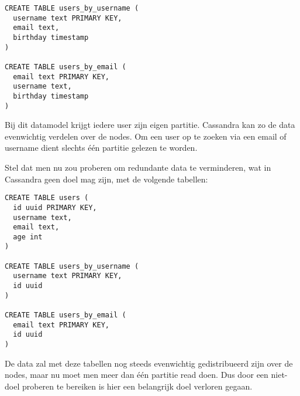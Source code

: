 \begin{lstlisting}
CREATE TABLE users_by_username (
  username text PRIMARY KEY,
  email text,
  birthday timestamp
)

CREATE TABLE users_by_email (
  email text PRIMARY KEY,
  username text,
  birthday timestamp
)
\end{lstlisting}

Bij dit datamodel krijgt iedere user zijn eigen partitie.
Cassandra kan zo de data evenwichtig verdelen over de nodes.
Om een user op te zoeken via een email of username dient slechts één partitie gelezen te worden.

Stel dat men nu zou proberen om redundante data te verminderen, wat in Cassandra geen doel mag zijn, met de volgende tabellen:

\begin{lstlisting}
CREATE TABLE users (
  id uuid PRIMARY KEY,
  username text,
  email text,
  age int
)

CREATE TABLE users_by_username (
  username text PRIMARY KEY,
  id uuid
)

CREATE TABLE users_by_email (
  email text PRIMARY KEY,
  id uuid
)
\end{lstlisting}

De data zal met deze tabellen nog steeds evenwichtig gedistribueerd zijn over de nodes, maar nu moet men meer dan één partitie read doen.
Dus door een niet-doel proberen te bereiken is hier een belangrijk doel verloren gegaan.